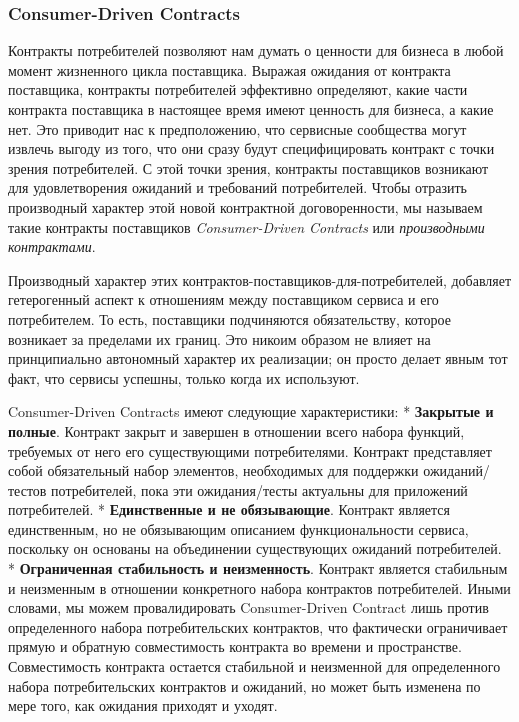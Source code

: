 \documentclass[11pt]{article}
\begin{document}
    \subsubsection{Consumer-Driven
Contracts}\label{consumer-driven-contracts}

Контракты потребителей позволяют нам думать о ценности для бизнеса в
любой момент жизненного цикла поставщика. Выражая ожидания от контракта
поставщика, контракты потребителей эффективно определяют, какие части
контракта поставщика в настоящее время имеют ценность для бизнеса, а
какие нет. Это приводит нас к предположению, что сервисные сообщества
могут извлечь выгоду из того, что они сразу будут специфицировать
контракт с точки зрения потребителей. С этой точки зрения, контракты
поставщиков возникают для удовлетворения ожиданий и требований
потребителей. Чтобы отразить производный характер этой новой контрактной
договоренности, мы называем такие контракты поставщиков
\emph{Consumer-Driven Contracts} или \emph{производными контрактами}.

Производный характер этих контрактов-поставщиков-для-потребителей,
добавляет гетерогенный аспект к отношениям между поставщиком сервиса и
его потребителем. То есть, поставщики подчиняются обязательству, которое
возникает за пределами их границ. Это никоим образом не влияет на
принципиально автономный характер их реализации; он просто делает явным
тот факт, что сервисы успешны, только когда их используют.

Consumer-Driven Contracts имеют следующие характеристики: *
\textbf{Закрытые и полные}. Контракт закрыт и завершен в отношении всего
набора функций, требуемых от него его существующими потребителями.
Контракт представляет собой обязательный набор элементов, необходимых
для поддержки ожиданий/тестов потребителей, пока эти ожидания/тесты
актуальны для приложений потребителей. * \textbf{Единственные и не
обязывающие}. Контракт является единственным, но не обязывающим
описанием функциональности сервиса, поскольку он основаны на объединении
существующих ожиданий потребителей. * \textbf{Ограниченная стабильность
и неизменность}. Контракт является стабильным и неизменным в отношении
конкретного набора контрактов потребителей. Иными словами, мы можем
провалидировать Consumer-Driven Contract лишь против определенного
набора потребительских контрактов, что фактически ограничивает прямую и
обратную совместимость контракта во времени и пространстве.
Совместимость контракта остается стабильной и неизменной для
определенного набора потребительских контрактов и ожиданий, но может
быть изменена по мере того, как ожидания приходят и уходят.
\end{document}
